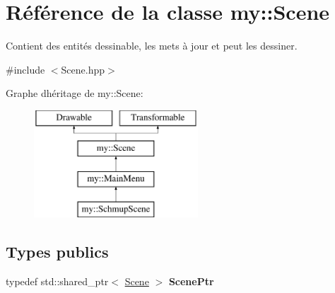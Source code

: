 \hypertarget{classmy_1_1Scene}{}\section{Référence de la classe my\+:\+:Scene}
\label{classmy_1_1Scene}


Contient des entités dessinable, les mets à jour et peut les dessiner.  




{\ttfamily \#include $<$Scene.\+hpp$>$}

Graphe d\textquotesingle{}héritage de my\+:\+:Scene\+:\begin{figure}[H]
\begin{center}
\leavevmode
\includegraphics[height=4.000000cm]{classmy_1_1Scene}
\end{center}
\end{figure}
\subsection*{Types publics}
\begin{DoxyCompactItemize}
\item 
\mbox{\label{classmy_1_1Scene_a6ad82b3ef155e510d2e0efad7f493f64}} 
typedef std\+::shared\+\_\+ptr$<$ \hyperlink{classmy_1_1Scene}{Scene} $>$ {\bfseries Scene\+Ptr}
\end{DoxyCompactItemize}
